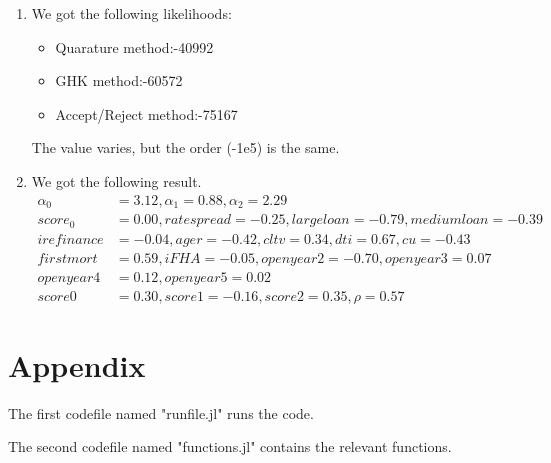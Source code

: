\documentclass{article}
\begin{document}
\begin{enumerate}
\item We got the following likelihoods: 
  \begin{itemize}
  \item  Quarature method:-40992
  \item  GHK method:-60572
  \item  Accept/Reject method:-75167
  \end{itemize}
  The value varies, but the order (-1e5) is the same.  
\item We got the following result. 
  \begin{align*}
    \alpha_0 &= 3.12, \alpha_1 = 0.88, \alpha_2 = 2.29 \\
    score_0 &= 0.00, rate spread = -0.25, large loan = -0.79, medium loan = -0.39 \\ 
    i refinance &= -0.04, age r = -0.42, cltv = 0.34, dti = 0.67, cu = -0.43 \\
    first mort &= 0.59, i FHA = -0.05, open year 2 = -0.70,open year 3 = 0.07 \\ 
    open year 4 &= 0.12, open year 5 =0.02 \\
    score0  &= 0.30, score1 = -0.16, score2 = 0.35, \rho = 0.57 
  \end{align*}
\end{enumerate}

\newpage
\section*{Appendix}
 	The first codefile named "runfile.jl" runs the code.
	
 	The second codefile named "functions.jl" contains the relevant functions.
\end{document}
